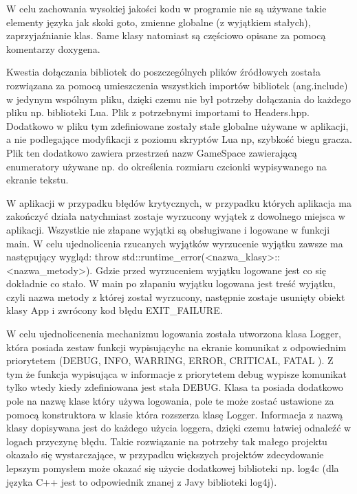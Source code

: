 W celu zachowania wysokiej jakości kodu w programie nie są używane takie elementy języka jak skoki goto, zmienne globalne (z wyjątkiem stałych), zaprzyjaźnianie klas. Same klasy natomiast są częściowo opisane za pomocą komentarzy doxygena.

Kwestia dołączania bibliotek do poszczególnych plików źródłowych została rozwiązana za pomocą umieszczenia wszystkich importów bibliotek (ang.include) w jedynym wspólnym pliku, dzięki czemu nie był potrzeby dołączania do każdego pliku np. biblioteki Lua. Plik z potrzebnymi importami to Headers.hpp. Dodatkowo w pliku tym zdefiniowane zostały stałe globalne używane w aplikacji, a nie podlegające modyfikacji z poziomu skryptów Lua np, szybkość biegu gracza. Plik ten dodatkowo zawiera przestrzeń nazw GameSpace zawierającą enumeratory używane np.  do określenia rozmiaru czcionki wypisywanego na ekranie tekstu.

W aplikacji w przypadku błędów krytycznych, w przypadku których aplikacja ma zakończyć działa natychmiast zostaje wyrzucony wyjątek z dowolnego miejsca w aplikacji. Wszystkie nie złapane wyjątki są obsługiwane i logowane w funkcji main. W celu ujednolicenia rzucanych wyjątków wyrzucenie wyjątku zawsze ma następujący wygląd: throw std::runtime\_error(<nazwa\_klasy>::<nazwa\_metody>). Gdzie przed wyrzuceniem wyjątku logowane jest co się dokładnie co stało. W main po złapaniu wyjątku logowana jest treść wyjątku, czyli nazwa metody z której został wyrzucony, następnie zostaje usunięty obiekt klasy App i zwrócony kod błędu EXIT\_FAILURE.
 
W celu ujednolicenenia mechanizmu logowania została utworzona klasa Logger, która posiada 
zestaw funkcji wypisującyhc na ekranie komunikat z odpowiednim priorytetem (DEBUG, INFO, WARRING, ERROR, CRITICAL, FATAL ). Z tym że funkcja wypisująca w informacje z priorytetem debug wypisze komunikat tylko wtedy kiedy zdefiniowana jest stała DEBUG. Klasa ta posiada dodatkowo pole na nazwę klase który używa logowania, pole te może zostać ustawione za pomocą konstruktora w klasie która rozszerza klasę Logger. Informacja z nazwą klasy dopisywana jest do każdego użycia loggera, dzięki czemu łatwiej odnaleźć w logach przyczynę błędu. Takie rozwiązanie na potrzeby tak małego projektu okazało się wystarczające, w przypadku większych projektów zdecydowanie lepszym pomysłem może okazać się użycie dodatkowej biblioteki np. log4c (dla języka C++ jest to odpowiednik znanej z Javy biblioteki log4j). 

